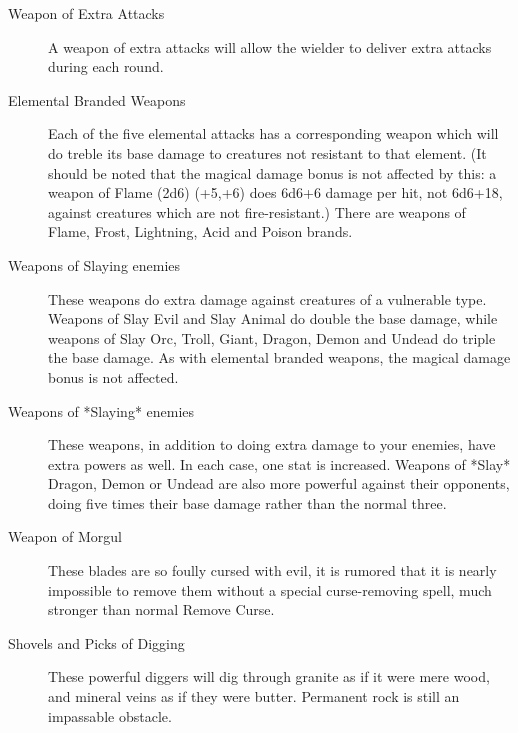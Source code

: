 \begin{description}
\item[Weapon of Extra Attacks]
     A weapon of extra attacks will allow the wielder to deliver extra
     attacks during each round.

\item[Elemental Branded Weapons]
     Each of the five elemental attacks has a corresponding weapon which
     will do treble its base damage to creatures not resistant to that
     element. (It should be noted that the magical damage bonus is not
     affected by this: a weapon of Flame (2d6) (+5,+6) does 6d6+6 damage
     per hit, not 6d6+18, against creatures which are not fire-resistant.)
     There are weapons of Flame, Frost, Lightning, Acid and Poison brands.

\item[Weapons of Slaying enemies]
     These weapons do extra damage against creatures of a vulnerable type.
     Weapons of Slay Evil and Slay Animal do double the base damage, while
     weapons of Slay Orc, Troll, Giant, Dragon, Demon and Undead do triple
     the base damage. As with elemental branded weapons, the magical damage
     bonus is not affected.

\item[Weapons of *Slaying* enemies]
     These weapons, in addition to doing extra damage to your enemies, have
     extra powers as well. In each case, one stat is increased. Weapons of
     *Slay* Dragon, Demon or Undead are also more powerful against their
     opponents, doing five times their base damage rather than the normal
     three.

\item[Weapon of Morgul]
     These blades are so foully cursed with evil, it is rumored that it is
     nearly impossible to remove them without a special curse-removing spell,
     much stronger than normal Remove Curse.

\item[Shovels and Picks of Digging]
     These powerful diggers will dig through granite as if it were mere wood,
     and mineral veins as if they were butter. Permanent rock is still an
     impassable obstacle.
\end{description}

